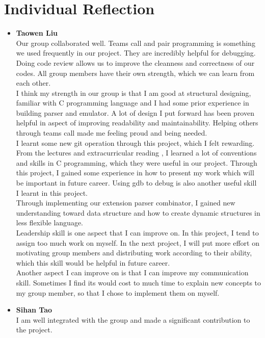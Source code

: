 \documentclass{article}
\begin{document}
\section{Individual Reflection}
\begin{itemize}
    \item \textbf{Taowen Liu}\\
    Our group collaborated well. Teams call and pair programming is something we used frequently in our project. They are incredibly helpful for debugging. Doing code review allows us to improve the cleanness and correctness of our codes. All group members have their own strength, which we can learn from each other.\\
    I think my strength in our group is that I am good at structural designing, familiar with C programming language and I had some prior experience in building parser and emulator. A lot of design I put forward has been proven helpful in aspect of improving readability and maintainability. Helping others through teams call made me feeling proud and being needed.\\
    I learnt some new git operation through this project, which I felt rewarding. From the lectures and extracurricular reading
    , I learned a lot of conventions and skills in C programming, which they were useful in our project. Through this project, I gained some experience in how to present my work which will be important in future career. Using gdb to debug is also another useful skill I learnt in this project.\\
    Through implementing our extension parser combinator, I gained new understanding toward data structure and how to create dynamic structures in less flexible language.\\
    Leadership skill is one aspect that I can improve on. In this project, I tend to assign too much work on myself. In the next project, I will put more effort on motivating group members and distributing work according to their ability, which this skill would be helpful in future career.\\
    Another aspect I can improve on is that I can improve my communication skill. Sometimes I find its would cost to much time to explain new concepts to my group member, so that I chose to implement them on myself.\\
    \item \textbf{Sihan Tao}\\
    I am well integrated with the group and made a significant contribution to the project.\\ 

\end{itemize}
\end{document}
